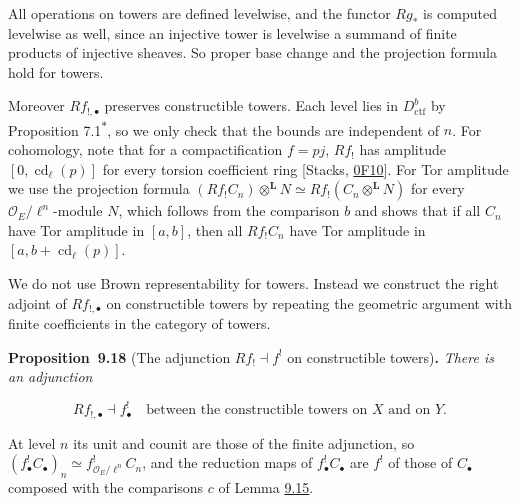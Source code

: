 \documentclass[11pt]{article}
\newenvironment{bpstatement}[2]{\par\addvspace{0.6\baselineskip}\noindent\textbf{#1}#2\textbf{.}\enspace\ignorespaces}
  {\par\addvspace{0.4\baselineskip}}
\newenvironment{bpstatementit}[2]{\begin{bpstatement}{#1}{#2}\itshape\ignorespaces}{\end{bpstatement}}
\newcommand{\bpout}[1]{#1\textsuperscript{\hyperlink{bp-outside}{\ensuremath{\ast}}}}
\begin{document}
\label{bp57}%
All operations on towers are defined levelwise, and the functor \(Rg_*\) is computed levelwise as well, since an injective tower is levelwise a summand of finite products of injective sheaves. So proper base change and the projection formula hold for towers.

Moreover \(Rf_{!,\bullet}\) preserves constructible towers. Each level lies in \(D^b_{\mathrm{ctf}}\) by Proposition \bpout{7.1}, so we only check that the bounds are independent of \(n\). For cohomology, note that for a compactification \(f=pj\), \(Rf_!\) has amplitude \([0,\operatorname{cd}_\ell(p)]\) for every torsion coefficient ring [Stacks, \href{https://stacks.math.columbia.edu/tag/0F10}{0F10}]. For Tor amplitude we use the projection formula \((Rf_!C_n)\otimes^{\mathbf L}N\simeq Rf_!(C_n\otimes^{\mathbf L}N)\) for every \(\mathcal O_E/\ell^n\)-module \(N\), which follows from the comparison \(b\) and shows that if all \(C_n\) have Tor amplitude in \([a,b]\), then all \(Rf_!C_n\) have Tor amplitude in \([a,b+\operatorname{cd}_\ell(p)]\).

We do not use Brown representability for towers. Instead we construct the right adjoint of \(Rf_{!,\bullet}\) on constructible towers by repeating the geometric argument with finite coefficients in the category of towers.

\label{bp58}%
\begin{bpstatementit}{Proposition~9.18}{ (The adjunction $Rf_!\dashv f^!$ on constructible towers)}
There is an adjunction

\[
Rf_{!,\bullet}\dashv f_\bullet^!
\quad\text{between the constructible towers on }X\text{ and on }Y.
\tag{9.18}
\]

At level \(n\) its unit and counit are those of the finite adjunction, so \((f_\bullet^!C_\bullet)_n\simeq f^!_{\mathcal O_E/\ell^n}C_n\), and the reduction maps of \(f_\bullet^!C_\bullet\) are \(f^!\) of those of \(C_\bullet\) composed with the comparisons \(c\) of Lemma \hyperref[bp47]{9.15}.
\end{bpstatementit}
\end{document}
